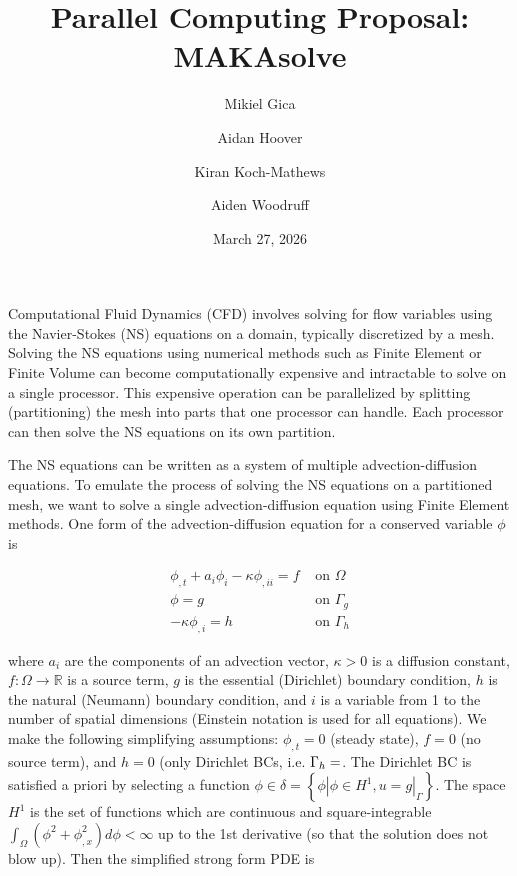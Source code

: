 \documentclass[12pt]{article}
\title{Parallel Computing Proposal: MAKAsolve}
\author{
	Mikiel Gica
	\and Aidan Hoover
	\and Kiran Koch-Mathews
	\and Aiden Woodruff
}
\date{March 27, 2026}
\begin{document}
\maketitle

Computational Fluid Dynamics (CFD) involves solving for flow variables using
the Navier-Stokes (NS) equations on a domain, typically discretized by a
mesh. Solving the NS equations using numerical methods such as Finite Element
or Finite Volume can become computationally expensive and intractable to
solve on a single processor.  This expensive operation can be parallelized by
splitting (partitioning) the mesh into parts that one processor can handle.
Each processor can then solve the NS equations on its own partition.

The NS equations can be written as a system of multiple advection-diffusion
equations. To emulate the process of solving the NS equations on a
partitioned mesh, we want to solve a single advection-diffusion equation
using Finite Element methods. One form of the advection-diffusion equation
for a conserved variable \(\phi\) is

\begin{equation}
	\begin{split}
		\phi_{,t} + a_i\phi_i - \kappa\phi_{,ii} = f & \text{ on } \Omega \\
		\phi = g & \text{ on } \Gamma_g \label{eq:strong1-ess} \\
		-\kappa\phi_{,i} = h & \text{ on } \Gamma_h
	\end{split}
\end{equation}

where \(a_i\) are the components of an advection vector, \(\kappa > 0\) is a
diffusion constant, \(f : \Omega \to \mathbb{R}\) is a source term, \(g\) is
the essential (Dirichlet) boundary condition, \(h\) is the natural (Neumann)
boundary condition, and \(i\) is a variable from 1 to the number of spatial
dimensions (Einstein notation is used for all equations). We make the
following simplifying assumptions: \(\phi_{,t} = 0\) (steady state),
\(f = 0\) (no source term), and \(h = 0\) (only Dirichlet BCs, i.e.
\(\Gamma_h = \empty\). The Dirichlet BC is satisfied a priori by selecting a
function
\(\phi \in \delta = \left\{\phi | \phi \in H^1, u = g |_\Gamma\right\}\). The
space \(H^1\) is the set of functions which are continuous and
square-integrable
\(\int_\Omega\left(\phi^2 + \phi^2_{,x}\right)d\phi < \infty\) up to the 1st
derivative (so that the solution does not blow up). Then the simplified
strong form PDE is
\end{document}
